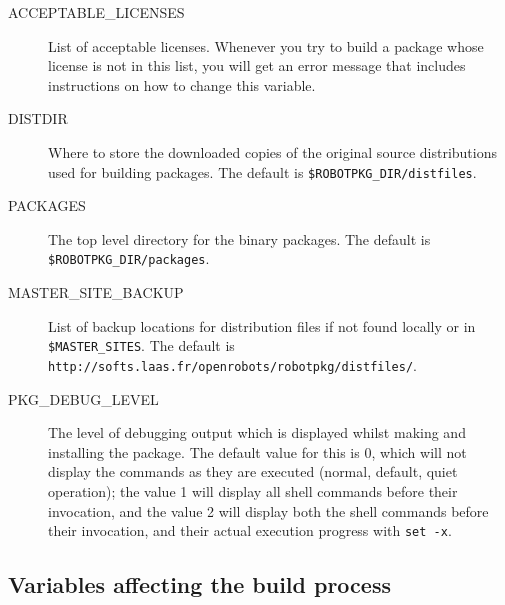 \begin{description}
   \item[ACCEPTABLE\_LICENSES] List of acceptable licenses. Whenever you try to
   build a package  whose license is  not in this  list, you will get  an error
   message that includes instructions on how to change this variable.

   \item[DISTDIR] Where to store the downloaded copies of the original source
   distributions used for building \robotpkg packages. The default is
   {\tt \${ROBOTPKG\_DIR}/distfiles}.

   \item[PACKAGES] The top level directory for the binary packages. The default
   is  {\tt \${ROBOTPKG\_DIR}/packages}.


   \item[MASTER\_SITE\_BACKUP] List  of backup locations for distribution files
   if not found locally  or  in {\tt \${MASTER\_SITES}}.  The default  is\\
   {\tt http://softs.laas.fr/openrobots/robotpkg/distfiles/}.

   \item[PKG\_DEBUG\_LEVEL] The  level of debugging  output  which is displayed
   whilst making and installing the package.  The  default value for this is 0,
   which will not  display the commands as they  are executed (normal, default,
   quiet  operation); the value 1 will  display all shell commands before their
   invocation,  and  the value  2 will  display both the  shell commands before
   their invocation, and their actual execution progress with {\tt set -x}.
\end{description}


\subsection{Variables affecting the build process} %

